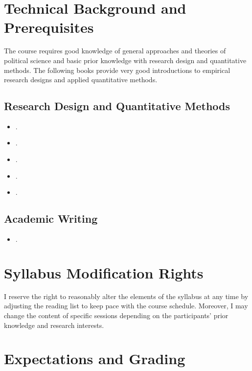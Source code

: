 \documentclass[abstract=on,parskip=full,headings=standardclasses,fontsize=11pt,paper=a4]{scrartcl}
\begin{document}
\section*{Technical Background and Prerequisites}

The course requires good knowledge of general approaches and theories of political science and basic prior knowledge with research design and quantitative methods. The following books provide very good introductions to empirical research designs and applied quantitative methods.

\subsection*{Research Design and Quantitative Methods}
\begin{itemize}
\item {}.
\item {}.
\item {}.
\item {}.
\item {}.
\end{itemize}

\subsection*{Academic Writing}
\begin{itemize}
\item {}.
\end{itemize}


\section*{Syllabus Modification Rights}

I reserve the right to reasonably alter the elements of the syllabus at any time by adjusting the reading list to keep pace with the course schedule. Moreover, I may change the content of specific sessions depending on the participants' prior knowledge and research interests.


\section*{Expectations and Grading}
\end{document}

